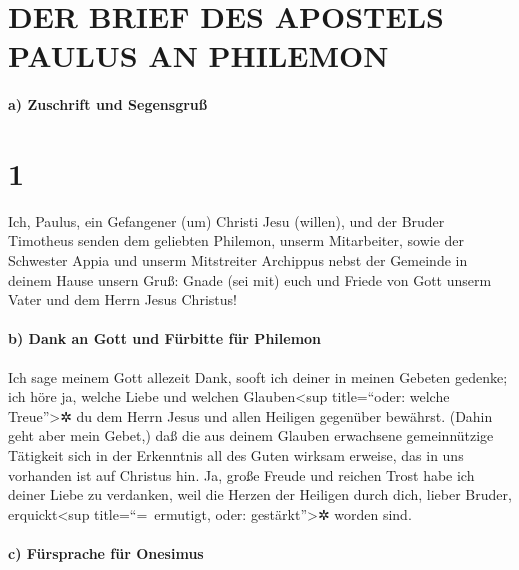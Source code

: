 \hypertarget{der-brief-des-apostels-paulus-an-philemon}{%
\section{DER BRIEF DES APOSTELS PAULUS AN
PHILEMON}\label{der-brief-des-apostels-paulus-an-philemon}}

\hypertarget{a-zuschrift-und-segensgruuxdf}{%
\paragraph{a) Zuschrift und
Segensgruß}\label{a-zuschrift-und-segensgruuxdf}}

\hypertarget{section}{%
\section{1}\label{section}}

 Ich, Paulus, ein Gefangener (um) Christi Jesu (willen),
und der Bruder Timotheus senden dem geliebten Philemon, unserm
Mitarbeiter,  sowie der Schwester Appia und unserm
Mitstreiter Archippus nebst der Gemeinde in deinem Hause unsern Gruß:
 Gnade (sei mit) euch und Friede von Gott unserm Vater und
dem Herrn Jesus Christus!

\hypertarget{b-dank-an-gott-und-fuxfcrbitte-fuxfcr-philemon}{%
\paragraph{b) Dank an Gott und Fürbitte für
Philemon}\label{b-dank-an-gott-und-fuxfcrbitte-fuxfcr-philemon}}

 Ich sage meinem Gott allezeit Dank, sooft ich deiner in
meinen Gebeten gedenke;  ich höre ja, welche Liebe und
welchen Glauben\textless sup title=``oder: welche Treue''\textgreater✲
du dem Herrn Jesus und allen Heiligen gegenüber bewährst. 
(Dahin geht aber mein Gebet,) daß die aus deinem Glauben erwachsene
gemeinnützige Tätigkeit sich in der Erkenntnis all des Guten wirksam
erweise, das in uns vorhanden ist auf Christus hin.  Ja,
große Freude und reichen Trost habe ich deiner Liebe zu verdanken, weil
die Herzen der Heiligen durch dich, lieber Bruder, erquickt\textless sup
title=``=~ermutigt, oder: gestärkt''\textgreater✲ worden sind.

\hypertarget{c-fuxfcrsprache-fuxfcr-onesimus}{%
\paragraph{c) Fürsprache für
Onesimus}\label{c-fuxfcrsprache-fuxfcr-onesimus}}


